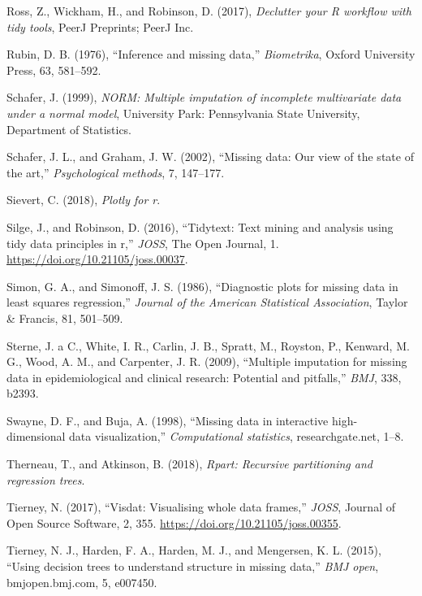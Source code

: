 \documentclass[]{article}
\theoremstyle{definition}
\theoremstyle{definition}
\theoremstyle{definition}
\theoremstyle{remark}
\begin{document}
\leavevmode\hypertarget{ref-Ross2017}{}%
Ross, Z., Wickham, H., and Robinson, D. (2017), \emph{Declutter your R
workflow with tidy tools}, PeerJ Preprints; PeerJ Inc.

\leavevmode\hypertarget{ref-Rubin1976}{}%
Rubin, D. B. (1976), ``Inference and missing data,'' \emph{Biometrika},
Oxford University Press, 63, 581--592.

\leavevmode\hypertarget{ref-schafer-norm}{}%
Schafer, J. (1999), \emph{NORM: Multiple imputation of incomplete
multivariate data under a normal model}, University Park: Pennsylvania
State University, Department of Statistics.

\leavevmode\hypertarget{ref-Schafer2002}{}%
Schafer, J. L., and Graham, J. W. (2002), ``Missing data: Our view of
the state of the art,'' \emph{Psychological methods}, 7, 147--177.

\leavevmode\hypertarget{ref-plotly}{}%
Sievert, C. (2018), \emph{Plotly for r}.

\leavevmode\hypertarget{ref-tidytext}{}%
Silge, J., and Robinson, D. (2016), ``Tidytext: Text mining and analysis
using tidy data principles in r,'' \emph{JOSS}, The Open Journal, 1.
\url{https://doi.org/10.21105/joss.00037}.

\leavevmode\hypertarget{ref-Simon1986}{}%
Simon, G. A., and Simonoff, J. S. (1986), ``Diagnostic plots for missing
data in least squares regression,'' \emph{Journal of the American
Statistical Association}, Taylor \& Francis, 81, 501--509.

\leavevmode\hypertarget{ref-Sterne2009}{}%
Sterne, J. a C., White, I. R., Carlin, J. B., Spratt, M., Royston, P.,
Kenward, M. G., Wood, A. M., and Carpenter, J. R. (2009), ``Multiple
imputation for missing data in epidemiological and clinical research:
Potential and pitfalls,'' \emph{BMJ}, 338, b2393.

\leavevmode\hypertarget{ref-Swayne1998}{}%
Swayne, D. F., and Buja, A. (1998), ``Missing data in interactive
high-dimensional data visualization,'' \emph{Computational statistics},
researchgate.net, 1--8.

\leavevmode\hypertarget{ref-rpart}{}%
Therneau, T., and Atkinson, B. (2018), \emph{Rpart: Recursive
partitioning and regression trees}.

\leavevmode\hypertarget{ref-visdat}{}%
Tierney, N. (2017), ``Visdat: Visualising whole data frames,''
\emph{JOSS}, Journal of Open Source Software, 2, 355.
\url{https://doi.org/10.21105/joss.00355}.

\leavevmode\hypertarget{ref-Tierney2015}{}%
Tierney, N. J., Harden, F. A., Harden, M. J., and Mengersen, K. L.
(2015), ``Using decision trees to understand structure in missing
data,'' \emph{BMJ open}, bmjopen.bmj.com, 5, e007450.
\end{document}
